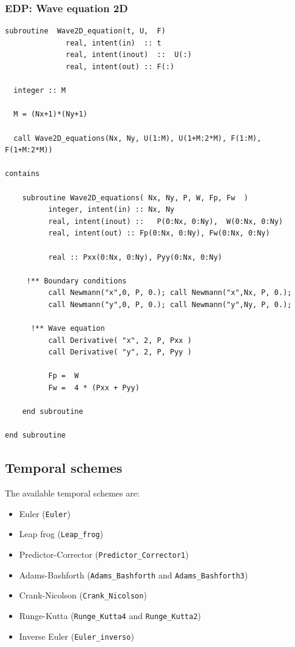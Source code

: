 \newpage


\subsubsection*{EDP: Wave equation 2D}

\begin{blueframed}
{\begin{small}
\begin{lstlisting}
subroutine  Wave2D_equation(t, U,  F)            
              real, intent(in)  :: t
              real, intent(inout)  ::  U(:)
              real, intent(out) :: F(:)

  integer :: M 

  M = (Nx+1)*(Ny+1) 
 
  call Wave2D_equations(Nx, Ny, U(1:M), U(1+M:2*M), F(1:M), F(1+M:2*M)) 

contains 

	subroutine Wave2D_equations( Nx, Ny, P, W, Fp, Fw  ) 
	      integer, intent(in) :: Nx, Ny 
	      real, intent(inout) ::   P(0:Nx, 0:Ny),  W(0:Nx, 0:Ny) 
	      real, intent(out) :: Fp(0:Nx, 0:Ny), Fw(0:Nx, 0:Ny) 
	
	      real :: Pxx(0:Nx, 0:Ny), Pyy(0:Nx, 0:Ny) 
	
	 !** Boundary conditions 
	      call Newmann("x",0, P, 0.); call Newmann("x",Nx, P, 0.);
	      call Newmann("y",0, P, 0.); call Newmann("y",Ny, P, 0.); 
	
	  !** Wave equation
	      call Derivative( "x", 2, P, Pxx ) 
	      call Derivative( "y", 2, P, Pyy ) 
	
	      Fp =  W 
	      Fw =  4 * (Pxx + Pyy) 
	
	end subroutine 

end subroutine 

\end{lstlisting}
\end{small}}
\end{blueframed} 

\subsection{Temporal schemes}

The available temporal schemes are: 

\begin{itemize}
  \item Euler (\texttt{Euler})
  \item Leap frog (\texttt{Leap\_frog})
  \item Predictor-Corrector (\texttt{Predictor\_Corrector1})
  \item Adams-Bashforth (\texttt{Adams\_Bashforth} and
  \texttt{Adams\_Bashforth3})
  \item Crank-Nicolson (\texttt{Crank\_Nicolson})
  \item Runge-Kutta (\texttt{Runge\_Kutta4} and \texttt{Runge\_Kutta2})
  \item Inverse Euler (\texttt{Euler\_inverso})
\end{itemize}

